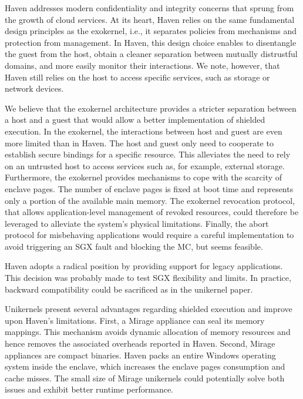 Haven addresses modern confidentiality and integrity concerns that sprung from the growth of cloud services.
At its heart, Haven relies on the same fundamental design principles as the exokernel, i.e., it separates policies from mechanisms and protection from management.
In Haven, this design choice enables to disentangle the guest from the host, obtain a cleaner separation between mutually distrustful domains, and more easily monitor their interactions.
We note, however, that Haven still relies on the host to access specific services, such as storage or network devices.

We believe that the exokernel architecture provides a stricter separation between a host and a guest that would allow a better implementation of shielded execution.
In the exokernel, the interactions between host and guest are even more limited than in Haven.
The host and guest only need to cooperate to establish secure bindings for a specific resource.
This alleviates the need to rely on an untrusted host to access services such as, for example, external storage.
Furthermore, the exokernel provides mechanisms to cope with the scarcity of enclave pages.
The number of enclave pages is fixed at boot time and represents only a portion of the available main memory.
The exokernel revocation protocol, that allows application-level management of revoked resources, could therefore be leveraged to alleviate the system's physical limitations.
Finally, the abort protocol for misbehaving applications would require a careful implementation to avoid triggering an SGX fault and blocking the MC, but seems feasible.

Haven adopts a radical position by providing support for legacy applications.
This decision was probably made to test SGX flexibility and limits.
In practice, backward compatibility could be sacrificed as in the unikernel paper.

Unikernels present several advantages regarding shielded execution and improve upon Haven's limitations.
First, a Mirage appliance can seal its memory mappings.
This mechanism avoids dynamic allocation of memory resources and hence removes the associated overheads reported in Haven.
Second, Mirage appliances are compact binaries.
Haven packs an entire Windows operating system inside the enclave, which increases the enclave pages consumption and cache misses.
The small size of Mirage unikernels could potentially solve both issues and exhibit better runtime performance.
